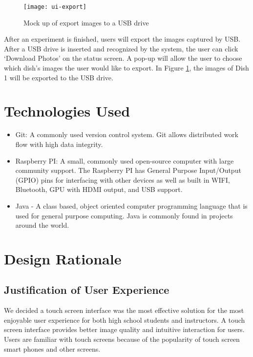 \begin{figure}[H]
\texttt{[image: ui-export]}
\caption{\label{figure:ui-export} Mock up of export images to a USB drive}
\end{figure}

After an experiment is finished, users will export the images captured by USB. After a USB drive is inserted and recognized by the system, the user can click `Download Photos' on the status screen. A pop-up will allow the user to choose which dish's images the user would like to export. In Figure \ref{figure:ui-export}, the images of Dish 1 will be exported to the USB drive.




\section{Technologies Used}
	\begin{itemize}
	\item Git: A commonly used version control system. Git allows distributed work flow with high data integrity.
	\item Raspberry PI: A small, commonly used open-source computer with large community support. The Raspberry PI has General Purpose Input/Output (GPIO) pins for interfacing with other devices as well as built in WIFI, Bluetooth, GPU with HDMI output, and USB support.
	\item Java - A class based, object oriented computer programming language that is used for general purpose computing. Java is commonly found in projects around the world.
	\end{itemize}


\section{Design Rationale}
\subsection{Justification of User Experience}

We decided a touch screen interface was the most effective solution for the most enjoyable user experience for both high school students and instructors. A touch screen interface provides better image quality and intuitive interaction for users. Users are familiar with touch screens because of the popularity of touch screen smart phones and other screens.

